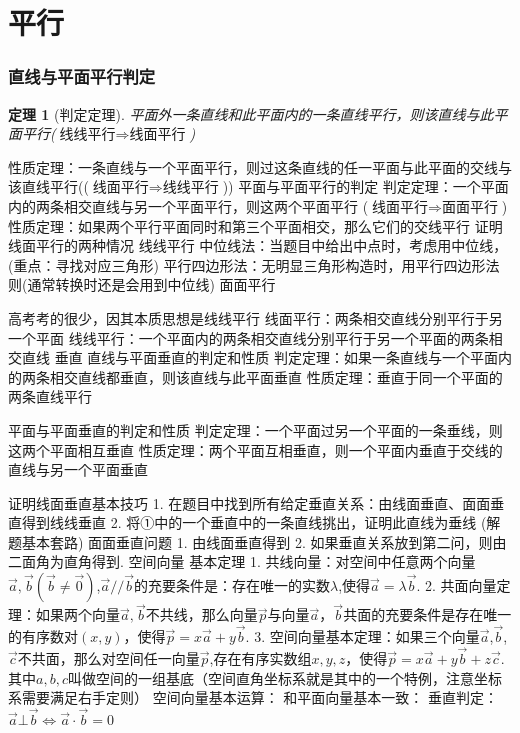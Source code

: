 \documentclass{BHCexam}
\begin{document}
\newtheorem{Therome}{定理}
\section{平行}
\subsubsection{直线与平面平行判定}
\begin{Therome}[判定定理]
平面外一条直线和此平面内的一条直线平行，则该直线与此平面平行($\text{线线平行}\Rightarrow\text{线面平行}$)
\end{Therome}


性质定理：一条直线与一个平面平行，则过这条直线的任一平面与此平面的交线与该直线平行(($\text{线面平行}\Rightarrow\text{线线平行}$))
平面与平面平行的判定
判定定理：一个平面内的两条相交直线与另一个平面平行，则这两个平面平行
($\text{线面平行}\Rightarrow\text{面面平行}$)
性质定理：如果两个平行平面同时和第三个平面相交，那么它们的交线平行
证明线面平行的两种情况
 线线平行
中位线法：当题目中给出中点时，考虑用中位线，(重点：寻找对应三角形)
平行四边形法：无明显三角形构造时，用平行四边形法则(通常转换时还是会用到中位线)
 面面平行

高考考的很少，因其本质思想是线线平行
线面平行：两条相交直线分别平行于另一个平面
线线平行：一个平面内的两条相交直线分别平行于另一个平面的两条相交直线
垂直
直线与平面垂直的判定和性质
判定定理：如果一条直线与一个平面内的两条相交直线都垂直，则该直线与此平面垂直
性质定理：垂直于同一个平面的两条直线平行


平面与平面垂直的判定和性质
判定定理：一个平面过另一个平面的一条垂线，则这两个平面相互垂直
性质定理：两个平面互相垂直，则一个平面内垂直于交线的直线与另一个平面垂直


证明线面垂直基本技巧
1. 在题目中找到所有给定垂直关系：由线面垂直、面面垂直得到线线垂直
2. 将①中的一个垂直中的一条直线挑出，证明此直线为垂线 (解题基本套路)
面面垂直问题
1. 由线面垂直得到
2. 如果垂直关系放到第二问，则由二面角为直角得到.
空间向量
基本定理
1. 共线向量：对空间中任意两个向量$\vec{a},\vec{b}(\vec{b}\ne\vec{0})$,$\vec{a}//\vec{b}$的充要条件是：存在唯一的实数$\lambda$,使得$\vec{a}=\lambda\vec{b}$.
2. 共面向量定理：如果两个向量$\vec{a},\vec{b}$不共线，那么向量$\vec{p}$与向量$\vec{a}$，$\vec{b}$共面的充要条件是存在唯一的有序数对$(x,y)$，使得$\vec{p}=x\vec{a}+y\vec{b}$.
3. 空间向量基本定理：如果三个向量$\vec{a}$,$\vec{b}$,$\vec{c}$不共面，那么对空间任一向量$\vec{p}$,存在有序实数组${x,y,z}$，使得$\vec{p}=x\vec{a}+y\vec{b}+z\vec{c}$.其中${a,b,c}$叫做空间的一组基底（空间直角坐标系就是其中的一个特例，注意坐标系需要满足右手定则）
 空间向量基本运算：
和平面向量基本一致：
垂直判定：$\vec{a}\bot\vec{b}\Leftrightarrow\vec{a}\cdot\vec{b}=0$
\end{document}

